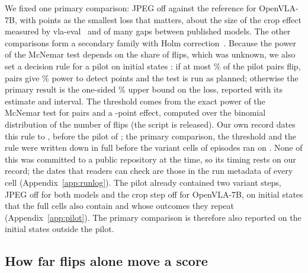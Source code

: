 We fixed one primary comparison: JPEG off against the reference for OpenVLA-7B, with \ThresholdPts{} points as the smallest loss that matters, about the size of the crop effect measured by vla-eval~\citep{vlaeval} and of many gaps between published models. The other \NSecondary{} comparisons form a secondary family with Holm correction~\citep{holm1979}. Because the power of the McNemar test depends on the share of flips, which was unknown, we also set a decision rule for a pilot on initial states \SplitA: if at most \DiscThreshold\% of the pilot pairs flip, \NPairs{} pairs give \PowerTarget\% power to detect \ThresholdPts{} points and the test is run as planned; otherwise the primary result is the one-sided \AlphaPct\% upper bound on the loss, reported with its estimate and interval. The threshold comes from the exact power of the McNemar test for \NPairs{} pairs and a \ThresholdPts-point effect, computed over the binomial distribution of the number of flips (the script is released). Our own record dates this rule to \RuleDate, before the pilot of \PilotDate; the primary comparison, the threshold and the rule were written down in full before the variant cells of \NPairs{} episodes ran on \VariantDates. None of this was committed to a public repository at the time, so its timing rests on our record; the dates that readers can check are those in the run metadata of every cell (Appendix~\ref{app:runlog}). The pilot already contained two variant steps, JPEG off for both models and the crop step off for OpenVLA-7B, on \PilotPairs{} initial states that the full cells also contain and whose outcomes they repeat (Appendix~\ref{app:pilot}). The primary comparison is therefore also reported on the \OutPairs{} initial states outside the pilot.

\subsection{How far flips alone move a score}
\label{sec:band}

